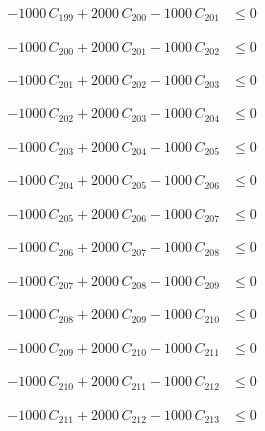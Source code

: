 \documentclass[a4paper,11pt]{article}
\begin{document}
\begin{align}
-1000\,C_{199} + 2000\,C_{200} - 1000\,C_{201} &\leq 0 \nonumber
\end{align}

\begin{align}
-1000\,C_{200} + 2000\,C_{201} - 1000\,C_{202} &\leq 0 \nonumber
\end{align}

\begin{align}
-1000\,C_{201} + 2000\,C_{202} - 1000\,C_{203} &\leq 0 \nonumber
\end{align}

\begin{align}
-1000\,C_{202} + 2000\,C_{203} - 1000\,C_{204} &\leq 0 \nonumber
\end{align}

\begin{align}
-1000\,C_{203} + 2000\,C_{204} - 1000\,C_{205} &\leq 0 \nonumber
\end{align}

\begin{align}
-1000\,C_{204} + 2000\,C_{205} - 1000\,C_{206} &\leq 0 \nonumber
\end{align}

\begin{align}
-1000\,C_{205} + 2000\,C_{206} - 1000\,C_{207} &\leq 0 \nonumber
\end{align}

\begin{align}
-1000\,C_{206} + 2000\,C_{207} - 1000\,C_{208} &\leq 0 \nonumber
\end{align}

\begin{align}
-1000\,C_{207} + 2000\,C_{208} - 1000\,C_{209} &\leq 0 \nonumber
\end{align}

\begin{align}
-1000\,C_{208} + 2000\,C_{209} - 1000\,C_{210} &\leq 0 \nonumber
\end{align}

\begin{align}
-1000\,C_{209} + 2000\,C_{210} - 1000\,C_{211} &\leq 0 \nonumber
\end{align}

\begin{align}
-1000\,C_{210} + 2000\,C_{211} - 1000\,C_{212} &\leq 0 \nonumber
\end{align}

\begin{align}
-1000\,C_{211} + 2000\,C_{212} - 1000\,C_{213} &\leq 0 \nonumber
\end{align}
\end{document}
